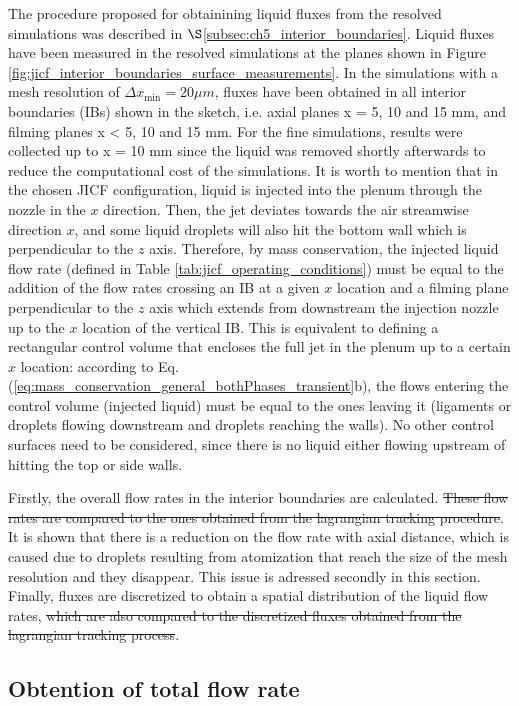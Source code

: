 The procedure proposed for obtainining liquid fluxes from the resolved simulations was described in $\S$\ref{subsec:ch5_interior_boundaries}. Liquid fluxes have been measured in the resolved simulations at the planes shown in Figure \ref{fig:jicf_interior_boundaries_surface_measurements}. In the simulations with a mesh resolution of $\Delta x_\mathrm{min} = 20 \mu m$, fluxes have been obtained in all interior boundaries (IBs) shown in the sketch, i.e. axial planes x = 5, 10 and 15 mm, and filming planes x < 5, 10 and 15 mm. For the fine simulations, results were collected up to x = 10 mm since the liquid was removed shortly afterwards to reduce the computational cost of the simulations. It is worth to mention that in the chosen JICF configuration, liquid is injected into the plenum through the nozzle in the $x$ direction. Then, the jet deviates towards the air streamwise direction $x$, and some liquid droplets will also hit the bottom wall which is perpendicular to the $z$ axis. Therefore, by mass conservation, the injected liquid flow rate (defined in Table \ref{tab:jicf_operating_conditions}) must be equal to the addition of the flow rates crossing an IB at a given $x$ location and a filming plane perpendicular to the $z$ axis which extends from downstream the injection nozzle up to the $x$ location of the vertical IB. This is equivalent to defining a rectangular control volume that encloses the full jet in the plenum up to a certain $x$ location: according to Eq. (\ref{eq:mass_conservation_general_bothPhases_transient}b), the flows entering the control volume (injected liquid) must be equal to the ones leaving it (ligaments or droplets flowing downstream and droplets reaching the walls). No other control surfaces need to be considered, since there is no liquid either flowing upstream of hitting the top or side walls.

Firstly, the overall flow rates in the interior boundaries are calculated. \st{These flow rates are compared to the ones obtained from the lagrangian tracking procedure}. It is shown that there is a reduction on the flow rate with axial distance, which is caused due to droplets resulting from atomization that reach the size of the mesh resolution and they disappear. This issue is adressed secondly in this section. Finally, fluxes are discretized to obtain a spatial distribution of the liquid flow rates, \st{which are also compared to the discretized fluxes obtained from the lagrangian tracking process}.

\subsection{Obtention of total flow rate}

